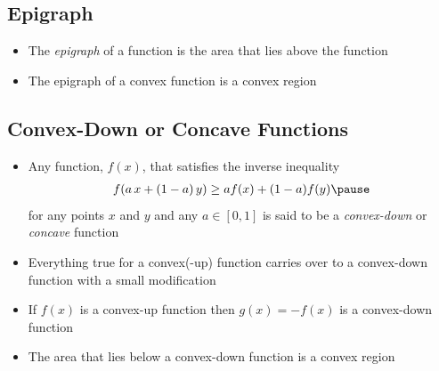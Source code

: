 
\begin{slide}
\section[-2]{Epigraph}

\begin{PauseHighLight}
  \begin{itemize}
  \item The \emph{epigraph} of a function is the area that lies above
    the function\pause
  \item The epigraph of a convex function is a convex region
    \begin{center}
      \pauseb
    \end{center}
  \end{itemize}
\end{PauseHighLight}

\end{slide}


\begin{slide}
\section[-2]{Convex-Down or Concave Functions}

\begin{PauseHighLight}
  \begin{itemize}
  \item Any function, $f(x)$, that satisfies the inverse inequality
    \begin{align*}
      f(a \,x + (1-a)\, y) \geq a f(x) + (1-a) f(y)\pause
    \end{align*}
    for any points $x$ and $y$ and any $a\in[0,1]$ is said to be a
    \emph{convex-down} or \emph{concave} function\pause
  \item Everything true for a convex(-up) function carries over to a
    convex-down function with a small modification\pause
  \item If $f(x)$ is a convex-up function then $g(x)=-f(x)$ is a
    convex-down function\pause
  \item The area that lies below a convex-down function is a convex
    region\pause
  \end{itemize}
\end{PauseHighLight}

\end{slide}

